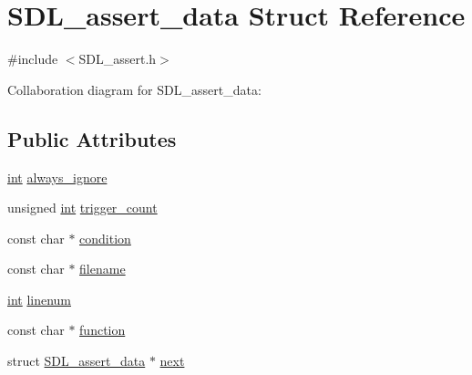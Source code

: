 \hypertarget{struct_s_d_l__assert__data}{\section{S\-D\-L\-\_\-assert\-\_\-data Struct Reference}
\label{struct_s_d_l__assert__data}
}


{\ttfamily \#include $<$S\-D\-L\-\_\-assert.\-h$>$}



Collaboration diagram for S\-D\-L\-\_\-assert\-\_\-data\-:
\subsection*{Public Attributes}
\begin{DoxyCompactItemize}
\item 
\hyperlink{_s_d_l__thread_8h_a6a64f9be4433e4de6e2f2f548cf3c08e}{int} \hyperlink{struct_s_d_l__assert__data_ac8997040e60dd538facd3604f0498dd4}{always\-\_\-ignore}
\item 
unsigned \hyperlink{_s_d_l__thread_8h_a6a64f9be4433e4de6e2f2f548cf3c08e}{int} \hyperlink{struct_s_d_l__assert__data_ac3e02d5e1ed06d11f7e49b6d652655d6}{trigger\-\_\-count}
\item 
const char $\ast$ \hyperlink{struct_s_d_l__assert__data_aa2e21779fd9c5fd035c6deabe8aa4325}{condition}
\item 
const char $\ast$ \hyperlink{struct_s_d_l__assert__data_ac4ae13a8034710658976e462a508ed39}{filename}
\item 
\hyperlink{_s_d_l__thread_8h_a6a64f9be4433e4de6e2f2f548cf3c08e}{int} \hyperlink{struct_s_d_l__assert__data_aec495b21ff71db1226eff0e6d5db333a}{linenum}
\item 
const char $\ast$ \hyperlink{struct_s_d_l__assert__data_a437899d4b1faaab73d14096374a5a18b}{function}
\item 
struct \hyperlink{struct_s_d_l__assert__data}{S\-D\-L\-\_\-assert\-\_\-data} $\ast$ \hyperlink{struct_s_d_l__assert__data_ab0beb52f0ae9d8b88dd90df4ad4b07ff}{next}
\end{DoxyCompactItemize}


